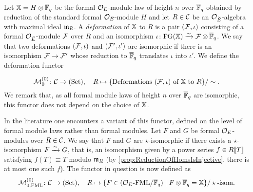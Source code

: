 \documentclass[../main.tex]{subfiles}
\begin{document}
Let $\mathbb{X} = H \otimes {\overline{\mathbb{F}}_q}$ be the formal $\mathcal{O}_E$-module law of height $n$
over ${\overline {\mathbb{F}}_q}$ obtained by reduction of the standard formal $\mathcal{O}_E$-module $H$
and let $R \in \mathcal{C}$ be an $\mathcal{O}_{\breve {E}}$-algebra with maximal ideal $\mathfrak{m}_R$. A
\emph{deformation}
of $\mathbb{X}$ to $R$ is a pair $(\mathcal{F}, \iota)$ consisting of a formal $\mathcal{O}_{\breve {E}}$-module $\mathcal{F}$ over $R$ and an isomorphism $\iota\colon \textnormal{FG}(\mathbb{X}) \xrightarrow{\sim}
\mathcal{F} \otimes {\overline{\mathbb{F}}_q}$. We say that two deformations $(\mathcal{F}, \iota)$ and $(\mathcal{F}',
\iota')$ are isomorphic if there is an isomorphism $\mathcal{F} \to \mathcal{F}'$ whose
reduction to ${\overline {\mathbb{F}}_q}$ translates $\iota$ into $\iota'$. We define the 
deformation functor

\begin{equation*}
  \mathcal{M}^{(0)}_0 \colon \mathcal{C} \to {(\mathrm{Set})}, \quad R \mapsto \{\text{Deformations $(\mathcal{F},
  \iota)$ of $\mathbb{X}$ to $R$}\}/\sim.
\end{equation*}
We remark that, as all formal module laws of height $n$ over ${\overline {\mathbb{F}}_q}$ are 
isomorphic, this functor does not depend on the choice of $\mathbb{X}$.

In the literature one encounters a variant of this functor, defined on the
level of formal
module laws rather than formal modules. Let $F$ and $G$ be formal $\mathcal{O}_E$-modules over
$R \in \mathcal{C}$. We say that $F$ and $G$ are $\star$-isomorphic if there exists a 
$\star$-isomorphism $F \xrightarrow{\sim} G$, that is, an isomorphism given by a power series
$f \in R\llbracket T \rrbracket$ satisfying $f(T) \equiv T$ modulo $\mathfrak{m}_R$ (by
\cref{prop:ReductionOfHomsIsInjective}, there is at most one such $f$).
The functor in question is now defined as 
\begin{equation*}
  \mathcal{M}^{(0)}_{0, \text{FML}} \colon \mathcal{C} \to {(\mathrm{Set})}, \quad R \mapsto \{F \in {({\mathcal{O}_E}\textnormal-\allowbreak\mathrm{FML}/{{\overline{\mathbb{F}}_q}})} \mid
  F \otimes {\overline{\mathbb{F}}_q} = \mathbb{X}\} / \star\text{-isom.}
\end{equation*}
\end{document}
